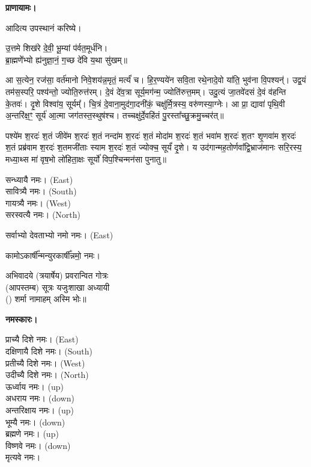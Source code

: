 \textbf{प्राणायामः।}


आदित्य उपस्थानं करिष्ये।

उ॒त्तमे शिख॑रे दे॒वी॒ भू॒म्यां प॑र्वत॒मूर्ध॑नि।\\
ब्रा॒ह्मणे॑॑भ्यो ह्य॑नुज्ञा॒नं॒ ग॒च्छ दे॑वि य॒था सु॑खम्॥



आ स॒त्येन॒ रज॑सा॒ वर्त॑मानो निवे॒शय॑न्न॒मृतं॒ मर्त्यं॑ च। हि॒र॒ण्यये॑न सवि॒ता रथे॒नादे॒वो या॑ति॒ भुव॑ना वि॒पश्यन्॑। उद्व॒यं तम॑स॒स्परि॒ पश्य॑न्तो॒ ज्योति॒रुत्त॑रम्। दे॒वं दे॑व॒त्रा सूर्य॒मग॑न्म॒ ज्योति॑रुत्त॒मम्। उदु॒त्यं जा॒तवे॑दसं दे॒वं व॑हन्ति के॒तवः॑। दृ॒शे विश्वा॑य॒ सूर्यम्᳚। चि॒त्रं दे॒वाना॒मुद॑गा॒दनी॑कं॒ चक्षु॑र्मि॒त्रस्य॒ वरु॑णस्या॒ग्नेः। आ प्रा॒ द्यावा॑ पृथि॒वी अ॒न्तरि॑क्ष॒ꣳ॒ सूर्य॑ आ॒त्मा जग॑तस्त॒स्थुष॑श्च। तच्चक्षु॑र्दे॒वहि॑तं पु॒रस्ता᳚च्छु॒क्रमु॒च्चर॑त्॥

पश्ये॑म श॒रदः॑ श॒तं जीवे॑म श॒रदः॑ श॒तं नन्दा॑म श॒रदः॑ श॒तं मोदा॑म श॒रदः॑ श॒तं भवा॑म श॒रदः॑ श॒तꣳ शृ॒णवा॑म श॒रदः॑ श॒तं प्रब्र॑वाम श॒रदः॑ श॒तमजी॑ताः स्याम श॒रदः॑ श॒तं ज्योक्च॒ सूर्यं॑ दृ॒शे। य उद॑गान्मह॒तोर्णवा᳚द्वि॒भ्राज॑मानः सरि॒रस्य॒ मध्या॒थ्स मा॑ वृष॒भो लो॑हिता॒क्षः सूर्यो॑ विप॒श्चिन्मन॑सा पुनातु॥



सन्ध्यायै नमः।  {\scriptsize (East)}\\
सावित्र्यै नमः। {\scriptsize (South)}\\
गायत्र्यै नमः।  {\scriptsize (West)}\\
सरस्वत्यै नमः।  {\scriptsize (North)}

सर्वाभ्यो देवताभ्यो नमो नमः। {\scriptsize (East)}

कामोऽकार्\mbox{}षी᳚न्मन्युरकार्\mbox{}षी᳚न्नमो॒ नमः।

अभिवादये \blank{} (त्रयार्षेय) प्रवरान्वित \blank{} गोत्रः\\
(आपस्तम्ब) सूत्रः यजुःशाखा अध्यायी\\
() शर्मा नामाहम् अस्मि भोः॥

\textbf{नमस्कारः।}


प्राच्यै दिशे नमः।   {\scriptsize (East)}\\
दक्षिणायै दिशे नमः।  {\scriptsize (South)}\\
प्रतीच्यै दिशे नमः।   {\scriptsize (West)}\\
उदीच्यै दिशे नमः।   {\scriptsize (North)}\\
ऊर्ध्वाय नमः।   {\scriptsize (up)}\\
अधराय नमः।   {\scriptsize (down)}\\
अन्तरिक्षाय नमः। {\scriptsize (up)}\\
भूम्यै नमः। {\scriptsize (down)}\\
ब्रह्मणे नमः। {\scriptsize (up)}\\
विष्णवे नमः।  {\scriptsize (down)}\\
मृत्यवे नमः।

